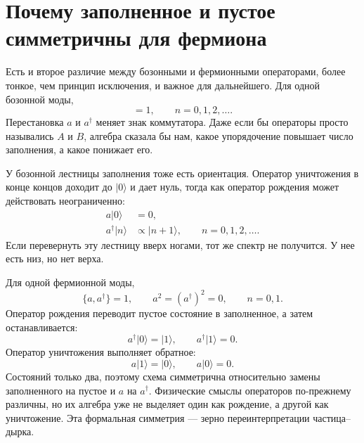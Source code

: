 \section{Почему заполненное и пустое симметричны для фермиона}

Есть и второе различие между бозонными и фермионными операторами, более тонкое, чем принцип исключения, и важное для дальнейшего. Для одной бозонной моды,
\begin{equation}
[a,a^\dagger]=1,
\qquad
n=0,1,2,\ldots.
\end{equation}
Перестановка \(a\) и \(a^\dagger\) меняет знак коммутатора. Даже если бы операторы просто назывались \(A\) и \(B\), алгебра сказала бы нам, какое упорядочение повышает число заполнения, а какое понижает его.

У бозонной лестницы заполнения тоже есть ориентация. Оператор уничтожения в конце концов доходит до \(\lvert0\rangle\) и дает нуль, тогда как оператор рождения может действовать неограниченно:
\begin{align}
a\lvert0\rangle&=0,\\
a^\dagger\lvert n\rangle&\propto\lvert n+1\rangle,
\qquad n=0,1,2,\ldots.
\end{align}
Если перевернуть эту лестницу вверх ногами, тот же спектр не получится. У нее есть низ, но нет верха.

Для одной фермионной моды,
\begin{equation}
\{a,a^\dagger\}=1,
\qquad
a^2=(a^\dagger)^2=0,
\qquad
n=0,1.
\label{eq:l10-fermion-mode}
\end{equation}
Оператор рождения переводит пустое состояние в заполненное, а затем останавливается:
\begin{equation}
a^\dagger\lvert0\rangle=\lvert1\rangle,
\qquad
a^\dagger\lvert1\rangle=0.
\end{equation}
Оператор уничтожения выполняет обратное:
\begin{equation}
a\lvert1\rangle=\lvert0\rangle,
\qquad
a\lvert0\rangle=0.
\end{equation}
Состояний только два, поэтому схема симметрична относительно замены заполненного на пустое и \(a\) на \(a^\dagger\). Физические смыслы операторов по-прежнему различны, но их алгебра уже не выделяет один как рождение, а другой как уничтожение. Эта формальная симметрия — зерно переинтерпретации частица–дырка.

\begin{classroomqa}
\end{classroomqa}

